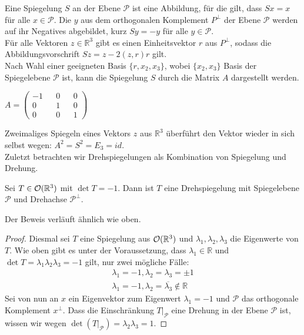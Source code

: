 \begin{bem}
Eine Spiegelung $S$ an der Ebene $\mathcal{P}$ ist eine Abbildung, für die gilt, dass $Sx=x$ für alle $x \in \mathcal{P}$. Die $y$ aus dem orthogonalen Komplement $P^{\perp}$ der Ebene $\mathcal{P}$ werden auf ihr Negatives abgebildet, kurz $Sy=-y$ für alle $y\in \mathcal{P}$.\\
Für alle Vektoren $z \in \mathbb{R}^3$ gibt es einen Einheitsvektor $r$ aus $P^{\perp}$, sodass die Abbildungsvorschrift $Sz = z -2(z,r)r$ gilt.\\
Nach Wahl einer geeigneten Basis $\{r, x_2, x_3\}$, wobei $\{x_2, x_3\}$ Basis der Spiegelebene $\mathcal{P}$ ist, kann die Spiegelung $S$ durch die Matrix $A$ dargestellt werden.
\begin{center}
  $A= \begin{pmatrix}
        -1 && 0 && 0 \\
        0 && 1 && 0 \\
        0 && 0 && 1 
       \end{pmatrix}$
 \end{center}
 \end{bem}
 Zweimaliges Spiegeln eines Vektors $z$ aus $\mathbb{R}^3$ überführt den Vektor wieder in sich selbst wegen: $A^2 = S^2 = E_3 = id$.\\
 Zuletzt betrachten wir Drehspiegelungen als Kombination von Spiegelung und Drehung.
 \begin{theorem}
 Sei $T\in{\mathcal{O}(\mathbb{R}^3)}$ mit $\det T = -1$. Dann ist $T$ eine Drehspiegelung mit Spiegelebene $\mathcal{P}$ und Drehachse $\mathcal{P}^{\perp}$.
 \end{theorem}
 Der Beweis verläuft ähnlich wie oben.
 \begin{proof}
 Diesmal sei $T$ eine Spiegelung aus ${\mathcal{O}(\mathbb{R}^3)}$ und $\lambda_1,\lambda_2, \lambda_3$ die Eigenwerte von $T$. Wie oben gibt es unter der Voraussetzung, dass $\lambda_1 \in \mathbb{R}$  und $\det T = \lambda_1\lambda_2\lambda_3=-1$ gilt, nur zwei mögliche Fälle:
 \begin{align}
   \lambda_1=-1, \lambda_2=\lambda_3=\pm1 \\
   \lambda_1=-1, \lambda_2=\overline{\lambda_3}\notin \mathbb{R}
  \end{align}
 Sei von nun an $x$ ein Eigenvektor zum Eigenwert $\lambda_1=-1$ und $\mathcal{P}$ das orthogonale Komplement $x^{\perp}$. Dass die Einschränkung $T|_\mathcal{P}$ eine Drehung in der Ebene $\mathcal{P}$ ist, wissen wir wegen $\det(T|_\mathcal{P}) = \lambda_2\lambda_3=1.$
 \end{proof}

